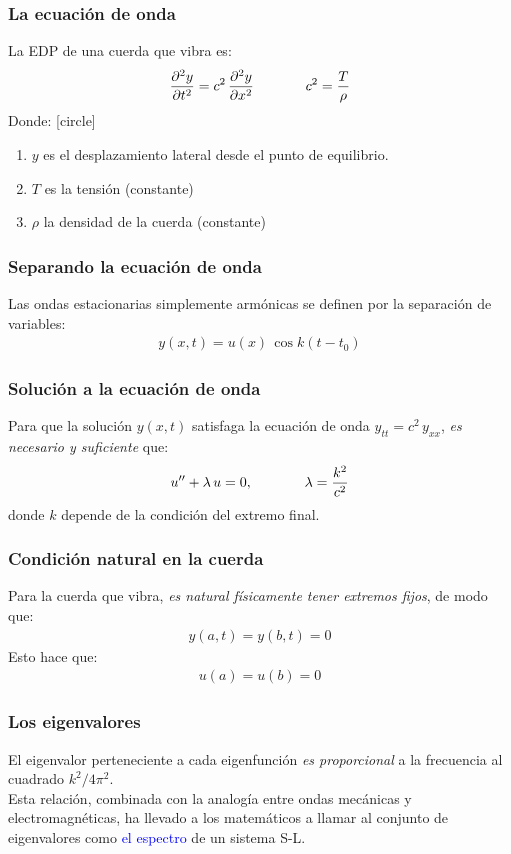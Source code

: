 \documentclass[12pt]{beamer}
\begin{document}
\begin{frame}
\frametitle{La ecuación de onda}
La EDP de una cuerda que vibra es:
\pause
\begin{align*}
\pdv[2]{y}{t} = c^{2} \, \pdv[2]{y}{x} \hspace{1.3cm} c^{2} = \dfrac{T}{\rho}
\end{align*}
\pause
Donde:
[circle]
\begin{enumerate}[<+->]
\item $y$ es el desplazamiento lateral desde el punto de equilibrio.
\item $T$ es la tensión (constante)
\item $\rho$ la densidad de la cuerda (constante)
\end{enumerate}
\end{frame}
\begin{frame}
\frametitle{Separando la ecuación de onda}
Las ondas estacionarias simplemente armónicas se definen por la separación de variables:
\begin{align*}
y (x, t) = u (x) \, \cos k(t - t_{0})
\end{align*}
\end{frame}
\begin{frame}
\frametitle{Solución a la ecuación de onda}
Para que la solución $y (x, t)$ satisfaga la ecuación de onda $y_{tt} = c^{2} \, y_{xx}$, \pause \emph{es necesario y suficiente} que:
\begin{align*}
{u}^{\prime \prime} + \lambda \, u = 0, \hspace{1.3cm} \lambda = \dfrac{k^{2}}{c^{2}}
\end{align*}
donde $k$ depende de la condición del extremo final.
\end{frame}
\begin{frame}
\frametitle{Condición natural en la cuerda}
Para la cuerda que vibra, \pause \emph{es natural físicamente tener extremos fijos}, de modo que:
\pause
\begin{align*}
y (a, t) = y (b, t) = 0
\end{align*}
\pause
Esto hace que:
\begin{align*}
u (a) = u (b) = 0
\end{align*}
\end{frame}
\begin{frame}
\frametitle{Los eigenvalores}
El eigenvalor perteneciente a cada eigenfunción \emph{es proporcional} a la frecuencia al cuadrado $k^{2}/4 \pi^{2}$.
\\
\bigskip
\pause
Esta relación, combinada con la analogía entre ondas mecánicas y electromagnéticas, ha llevado a los matemáticos a llamar al conjunto de eigenvalores como \textcolor{blue}{el espectro} de un sistema S-L.
\end{frame}
\end{document}
